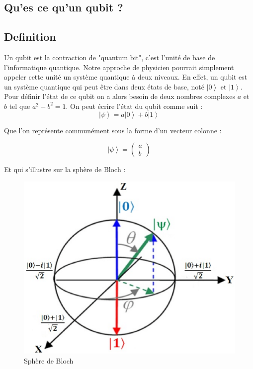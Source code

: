 \documentclass{article}
\begin{document}
\begin{multicols}{2}

\section{Qu'es ce qu'un qubit ?} 
\subsection{Definition}

Un qubit est la contraction de "quantum bit", c'est l'unité de base de l'informatique quantique.
Notre approche de physicien pourrait simplement appeler cette unité un système quantique à deux niveaux.
En effet, un qubit est un système quantique qui peut être dans deux états de base, noté $\left|0\right>$ et $\left|1\right>$.
Pour définir l'état de ce qubit on a alors besoin de deux nombres complexes $a$ et $b$ tel que $a^2 + b^2 = 1$.
On peut écrire l'état du qubit comme suit :
\begin{equation}
\left|\psi\right> = a\left|0\right> + b\left|1\right>
\end{equation}

Que l'on représente communément sous la forme d'un vecteur colonne :

\begin{equation}
\left|\psi\right> = \begin{pmatrix} a \\ b \end{pmatrix}
\end{equation}

Et qui s'illustre sur la sphère de Bloch :

\begin{figure}[H]
    \centering
    \includegraphics[width = \columnwidth]{fig/bloch_sphere.png}
    \caption{Sphère de Bloch}
    \label{fig:sphere_de_bloch}
\end{figure}


\end{multicols}
\end{document}
